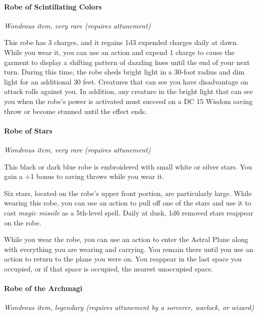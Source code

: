 \documentclass[
]{article}
\begin{document}
\hypertarget{robe-of-scintillating-colors}{%
\paragraph{Robe of Scintillating
Colors}\label{robe-of-scintillating-colors}}

\emph{Wondrous item, very rare (requires attunement)}

This robe has 3 charges, and it regains 1d3 expended charges daily at
dawn. While you wear it, you can use an action and expend 1 charge to
cause the garment to display a shifting pattern of dazzling hues until
the end of your next turn. During this time, the robe sheds bright light
in a 30-foot radius and dim light for an additional 30 feet. Creatures
that can see you have disadvantage on attack rolls against you. In
addition, any creature in the bright light that can see you when the
robe's power is activated must succeed on a DC 15 Wisdom saving throw or
become stunned until the effect ends.

\hypertarget{robe-of-stars}{%
\paragraph{Robe of Stars}\label{robe-of-stars}}

\emph{Wondrous item, very rare (requires attunement)}

This black or dark blue robe is embroidered with small white or silver
stars. You gain a +1 bonus to saving throws while you wear it.

Six stars, located on the robe's upper front portion, are particularly
large. While wearing this robe, you can use an action to pull off one of
the stars and use it to cast \emph{magic missile} as a 5th-level spell.
Daily at dusk, 1d6 removed stars reappear on the robe.

While you wear the robe, you can use an action to enter the Astral Plane
along with everything you are wearing and carrying. You remain there
until you use an action to return to the plane you were on. You reappear
in the last space you occupied, or if that space is occupied, the
nearest unoccupied space.

\hypertarget{robe-of-the-archmagi}{%
\paragraph{Robe of the Archmagi}\label{robe-of-the-archmagi}}

\emph{Wondrous item, legendary (requires attunement by a sorcerer,
warlock, or wizard)}
\end{document}

